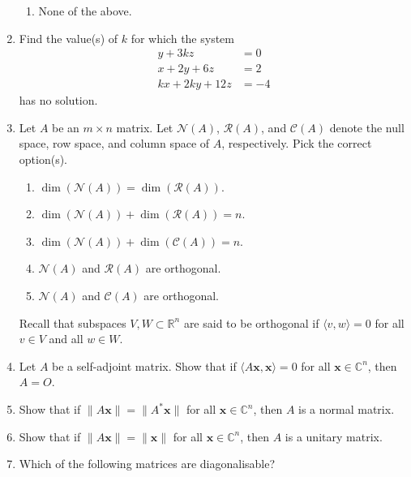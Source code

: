 \documentclass[12pt]{article}
\begin{document}
\begin{enumerate}[leftmargin=*]
\begin{enumerate}
	 	\item None of the above.
	 \end{enumerate}
	 \item Find the value(s) of $k$ for which the system
	 \begin{align*} 
	 	y + 3kz &= 0 \\
	 	x + 2y + 6z &= 2 \\
	 	kx + 2ky + 12z &= -4
	 \end{align*}
	 has no solution.
	 \item Let $A$ be an $m \times n$ matrix. Let $\mathcal{N}(A)$, $\mathcal{R}(A)$, and $\mathcal{C}(A)$ denote the null space, row space, and column space of $A$, respectively. Pick the correct option(s).
	 \begin{enumerate}
	 	\item $\dim(\mathcal{N}(A)) = \dim(\mathcal{R}(A))$.
	 	\item $\dim(\mathcal{N}(A)) + \dim(\mathcal{R}(A)) = n$.
	 	\item $\dim(\mathcal{N}(A)) + \dim(\mathcal{C}(A)) = n$.
	 	\item $\mathcal{N}(A)$ and $\mathcal{R}(A)$ are orthogonal.
	 	\item $\mathcal{N}(A)$ and $\mathcal{C}(A)$ are orthogonal.
	 \end{enumerate}
	 Recall that subspaces $V, W \subset \mathbb{R}^{n}$ are said to be orthogonal if $\langle v, w \rangle = 0$ for all $v \in V$ and all $w \in W$.
	 \item Let $A$ be a self-adjoint matrix. Show that if $\langle A \mathbf{x}, \mathbf{x}\rangle = 0$ for all $\mathbf{x} \in \mathbb{C}^{n}$, then $A = O$.
	 \item Show that if $\|A \mathbf{x}\| = \|A^{\ast} \mathbf{x}\|$ for all $\mathbf{x} \in \mathbb{C}^{n}$, then $A$ is a normal matrix.
	 \item Show that if $\|A \mathbf{x}\| = \|\mathbf{x}\|$ for all $\mathbf{x} \in \mathbb{C}^{n}$, then $A$ is a unitary matrix.
	 \item Which of the following matrices are diagonalisable?


\end{enumerate}
\end{document}

